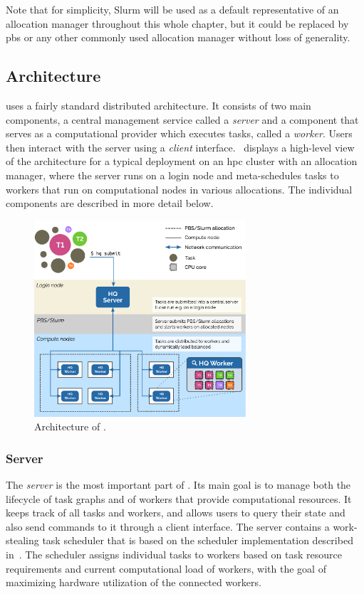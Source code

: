 Note that for simplicity, Slurm will be used as a default representative of an allocation manager
throughout this whole chapter, but it could be replaced by \gls{pbs} or any other
commonly used allocation manager without loss of generality.

\subsection{Architecture}
\label{hq:architecture}
\hyperqueue{} uses a fairly standard distributed architecture. It consists of two main
components, a central management service called a \emph{server} and a component that
serves as a computational provider which executes tasks, called a \emph{worker}. Users
then interact with the server using a \emph{client} interface.~
displays a high-level view of the \hq{} architecture for a typical deployment on
an \gls{hpc} cluster with an allocation manager, where the server runs on a login
node and meta-schedules tasks to workers that run on computational nodes in various allocations.
The individual components are described in more detail below.

\begin{figure}[h]
	\centering
	\includegraphics[width=0.7\textwidth]{imgs/hq/architecture}
	\caption{Architecture of \hyperqueue{}.}
	\label{fig:hq-architecture}
\end{figure}

\subsubsection*{Server}
The \emph{server} is the most important part of \hyperqueue{}. Its main goal is
to manage both the lifecycle of task graphs and of workers that provide computational resources. It
keeps track of all tasks and workers, and allows users to query their state and also send commands
to it through a client interface. The server contains a work-stealing task scheduler that is based
on the \rsds{} scheduler implementation described in~. The
scheduler assigns individual tasks to workers based on task resource requirements and current
computational load of workers, with the goal of maximizing hardware utilization of the connected
workers.

